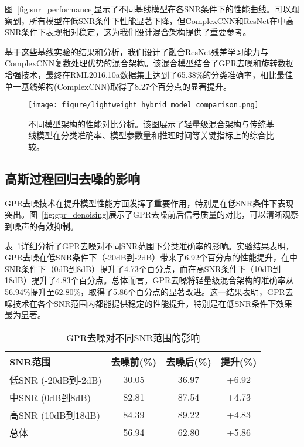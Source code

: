 \documentclass[conference]{IEEEtran}
\begin{document}
图~\ref{fig:snr_performance}显示了不同基线模型在各SNR条件下的性能曲线。可以观察到，所有模型在低SNR条件下性能显著下降，但ComplexCNN和ResNet在中高SNR条件下表现相对稳定，这为我们设计混合架构提供了重要参考。

基于这些基线实验的结果和分析，我们设计了融合ResNet残差学习能力与ComplexCNN复数处理优势的混合架构。该混合模型结合了GPR去噪和旋转数据增强技术，最终在RML2016.10a数据集上达到了65.38\%的分类准确率，相比最佳单一基线架构(ComplexCNN)取得了8.27个百分点的显著提升。

\begin{figure}[htbp]
\centering
\texttt{[image: figure/lightweight\_hybrid\_model\_comparison.png]}
\caption{不同模型架构的性能对比分析。该图展示了轻量级混合架构与传统基线模型在分类准确率、模型参数量和推理时间等关键指标上的综合比较。}
\label{fig:model_comparison}
\end{figure}

\subsection{高斯过程回归去噪的影响}

GPR去噪技术在提升模型性能方面发挥了重要作用，特别是在低SNR条件下表现突出。图~\ref{fig:gpr_denoising}展示了GPR去噪前后信号质量的对比，可以清晰观察到噪声的有效抑制。

表~\ref{tab:gpr_impact}详细分析了GPR去噪对不同SNR范围下分类准确率的影响。实验结果表明，GPR去噪在低SNR条件下（-20dB到-2dB）带来了6.92个百分点的性能提升，在中SNR条件下（0dB到8dB）提升了4.73个百分点，而在高SNR条件下（10dB到18dB）提升了4.83个百分点。总体而言，GPR去噪将轻量级混合架构的准确率从56.94\%提升至62.80\%，取得了5.86个百分点的显著改进。这一结果表明，GPR去噪技术在各个SNR范围内都能提供稳定的性能提升，特别是在低SNR条件下效果最为显著。

\begin{table}[h]
\centering
\caption{GPR去噪对不同SNR范围的影响}
\label{tab:gpr_impact}
\begin{tabular}{@{}lccc@{}}
\toprule
SNR范围 & 去噪前(\%) & 去噪后(\%) & 提升(\%) \\
\midrule
低SNR (-20dB到-2dB) & 30.05 & 36.97 & +6.92 \\
中SNR (0dB到8dB) & 82.81 & 87.54 & +4.73 \\
高SNR (10dB到18dB) & 84.39 & 89.22 & +4.83 \\
总体 & 56.94 & 62.80 & +5.86 \\
\bottomrule
\end{tabular}
\end{table}
\end{document}
